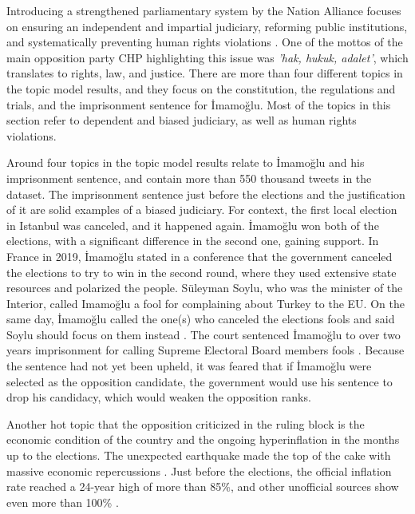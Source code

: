 Introducing a strengthened parliamentary system by the Nation Alliance focuses on ensuring an independent 
and impartial judiciary, reforming public institutions, and systematically preventing human rights 
violations \parencite{edgar_sar_opposition_election_agenda_2023}. One of the mottos of the main opposition 
party CHP highlighting this issue was \textit{'hak, hukuk, adalet'}, which translates to rights, law, and 
justice. There are more than four different topics in the topic model results, and they focus on the 
constitution, the regulations and trials, and the imprisonment sentence for İmamoğlu. 
Most of the topics in this section refer to dependent and biased judiciary, as well as human rights violations. 

Around four topics in the topic model results relate to İmamoğlu and his imprisonment sentence, and
contain more than 550 thousand tweets in the dataset. The imprisonment sentence 
just before the elections and the justification of it are solid examples of a biased judiciary. For context, 
the first local election in Istanbul was canceled, and it happened again. İmamoğlu won both of the 
elections, with a significant difference in the second one, gaining support. In France in 2019, 
İmamoğlu stated in a conference that the government canceled the elections to try to win in the second 
round, where they used extensive state resources and polarized the people. Süleyman Soylu, who was the 
minister of the Interior, called Imamoğlu a fool for complaining about Turkey to the EU. 
On the same day, İmamoğlu called the one(s) who canceled the elections fools and said Soylu should focus 
on them instead \parencite{bbc_imamoglu_dava_2022}. The court sentenced İmamoğlu to over two years 
imprisonment for calling Supreme Elec­toral Board members fools \parencite{aktürk_imamoglu_dava_2022}. 
Because the sentence had not yet been upheld, it was feared that if İmamoğlu were selected as the 
opposition candidate, the government would use his sentence to drop his candidacy, which would weaken 
the opposition ranks.

Another hot topic that the opposition criticized in the ruling block is the economic condition of the country 
and the ongoing hyperinflation in the months up to the elections. The unexpected earthquake made the top 
of the cake with massive economic repercussions \parencite{cevik_aksoy_turkey_earthquake_2023}. Just 
before the elections, the official infla­tion rate reached a 24-year high of more than 85\%, 
and other unofficial sources show even more than 100\% \parencite{edgar_sar_opposition_election_agenda_2023}. 

